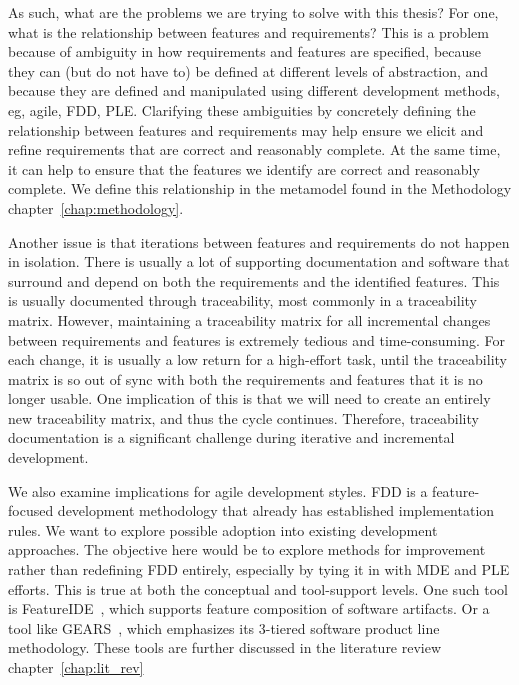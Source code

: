 As such, what are the problems we are trying to solve with this thesis? For one, what is the relationship between features and requirements? This is a problem because of ambiguity in how requirements and features are specified, because they can (but do not have to) be defined at different levels of abstraction, and because they are defined and manipulated using different development methods, eg, agile, FDD, PLE. Clarifying these ambiguities by concretely defining the relationship between features and requirements may help ensure we elicit and refine requirements that are correct and reasonably complete. At the same time, it can help to ensure that the features we identify are correct and reasonably complete. We define this relationship in the metamodel found in the Methodology chapter~\ref{chap:methodology}.

Another issue is that iterations between features and requirements do not happen in isolation. There is usually a lot of supporting documentation and software that surround and depend on both the requirements and the identified features. This is usually documented through traceability, most commonly in a traceability matrix. However, maintaining a traceability matrix for all incremental changes between requirements and features is extremely tedious and time-consuming. For each change, it is usually a low return for a high-effort task, until the traceability matrix is so out of sync with both the requirements and features that it is no longer usable. One implication of this is that we will need to create an entirely new traceability matrix, and thus the cycle continues. Therefore, traceability documentation is a significant challenge during iterative and incremental development.


We also examine implications for agile development styles. \gls{FDD} is a feature-focused development methodology that already has established implementation rules. We want to explore possible adoption into existing development approaches. The objective here would be to explore methods for improvement rather than redefining \gls{FDD} entirely, especially by tying it in with \gls{MDE} and \gls{PLE} efforts. This is true at both the conceptual and tool-support levels. One such tool is FeatureIDE~\cite{kastner2009featureide, thum2014featureide}, which supports feature composition of software artifacts. Or a tool like GEARS~\cite{GEARS}, which emphasizes its 3-tiered software product line methodology. These tools are further discussed in the literature review chapter~\ref {chap:lit_rev}

